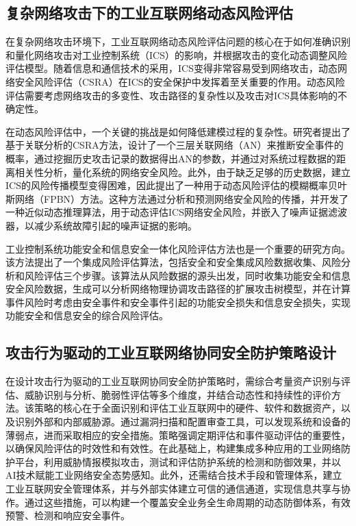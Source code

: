 \subsection{复杂网络攻击下的工业互联网络动态风险评估}

在复杂网络攻击环境下，工业互联网络动态风险评估问题的核心在于如何准确识别和量化网络攻击对工业控制系统（ICS）的影响，并根据攻击的变化动态调整风险评估模型。随着信息和通信技术的采用，ICS变得非常容易受到网络攻击，动态网络安全风险评估（CSRA）在ICS的安全保护中发挥着至关重要的作用。动态风险评估需要考虑网络攻击的多变性、攻击路径的复杂性以及攻击对ICS具体影响的不确定性。

在动态风险评估中，一个关键的挑战是如何降低建模过程的复杂性。研究者提出了基于关联分析的CSRA方法，设计了一个三层关联网络（AN）来推断安全事件的概率，通过挖掘历史攻击记录的数据得出AN的参数，并通过对系统过程数据的距离相关性分析，量化系统的网络安全风险。此外，由于缺乏足够的历史数据，建立ICS的风险传播模型变得困难，因此提出了一种用于动态风险评估的模糊概率贝叶斯网络（FPBN）方法。这种方法通过分析和预测网络安全风险的传播，并开发了一种近似动态推理算法，用于动态评估ICS网络安全风险，并嵌入了噪声证据滤波器，以减少系统故障引起的噪声证据的影响。

工业控制系统功能安全和信息安全一体化风险评估方法也是一个重要的研究方向。该方法提出了一个集成风险评估算法，包括安全和安全集成风险数据收集、风险分析和风险评估三个步骤。该算法从风险数据的源头出发，同时收集功能安全和信息安全风险数据，生成可以分析网络物理协调攻击路径的扩展攻击树模型，并在计算事件风险时考虑由安全事件和安全事件引起的功能安全损失和信息安全损失，实现功能安全和信息安全的综合风险评估。


\subsection{攻击行为驱动的工业互联网络协同安全防护策略设计}

在设计攻击行为驱动的工业互联网协同安全防护策略时，需综合考量资产识别与评估、威胁识别与分析、脆弱性评估等多个维度，并结合动态性和持续性的评价方法。该策略的核心在于全面识别和评估工业互联网中的硬件、软件和数据资产，以及识别外部和内部威胁源。通过漏洞扫描和配置审查工具，可以发现系统和设备的薄弱点，进而采取相应的安全措施。策略强调定期评估和事件驱动评估的重要性，以确保风险评估的时效性和有效性。在此基础上，构建集成多种应用的工业网络防护平台，利用威胁情报模拟攻击，测试和评估防护系统的检测和防御效果，并以AI技术赋能工业网络安全态势感知。此外，还需结合技术手段和管理体系，建立工业互联网安全管理体系，并与外部实体建立可信的通信通道，实现信息共享与协作。通过这些措施，可以构建一个覆盖安全业务全生命周期的动态防御体系，有效预警、检测和响应安全事件。
